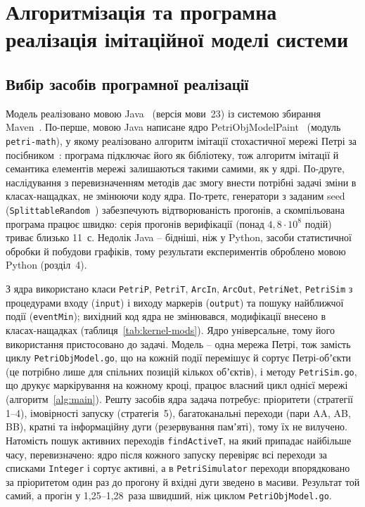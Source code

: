 \section{Алгоритмізація та програмна реалізація імітаційної моделі системи}

\subsection{Вибір засобів програмної реалізації}

Модель реалізовано мовою Java~\cite{java-jls} (версія мови~23) із системою збирання
Maven~\cite{maven}. По-перше, мовою Java написане ядро PetriObjModelPaint~\cite{petriobjmodelpaint}
(модуль \texttt{petri-math}), у якому реалізовано алгоритм імітації стохастичної мережі Петрі за
посібником~\cite{stetsenko-kursova,stetsenko-modeling}: програма підключає його як бібліотеку, тож
алгоритм імітації й семантика елементів мережі залишаються такими самими, як у ядрі. По-друге,
наслідування з перевизначенням методів дає змогу внести потрібні задачі зміни в класах-нащадках,
не змінюючи коду ядра. По-третє,
генератори з заданим seed (\texttt{SplittableRandom}~\cite{java-api}) забезпечують відтворюваність
прогонів, а скомпільована програма працює швидко: серія прогонів верифікації (понад
$4{,}8\cdot10^8$ подій) триває близько 11~с. Недолік Java -- бідніші, ніж у Python, засоби
статистичної обробки й побудови графіків, тому результати експериментів оброблено мовою Python
(розділ~4).

З ядра використано класи \texttt{PetriP}, \texttt{PetriT}, \texttt{ArcIn}, \texttt{ArcOut},
\texttt{PetriNet}, \texttt{PetriSim} з процедурами входу (\texttt{input}) і виходу маркерів
(\texttt{output}) та пошуку найближчої події (\texttt{eventMin}); вихідний код ядра не змінювався,
модифікації внесено в класах-нащадках (таблиця~\ref{tab:kernel-mods}). Ядро універсальне, тому
його використання пристосовано до задачі. Модель -- одна мережа Петрі,
тож замість циклу \texttt{PetriObjModel.go}, що на кожній події перемішує й сортує Петрі-обʼєкти
(це потрібно лише для спільних позицій кількох обʼєктів), і методу \texttt{PetriSim.go}, що друкує
маркірування на кожному кроці, працює власний цикл однієї мережі (алгоритм~\ref{alg:main}).
Решту засобів ядра задача потребує: пріоритети (стратегії 1--4), імовірності запуску (стратегія~5),
багатоканальні переходи (пари AA, AB, BB), кратні та інформаційну дуги (резервування памʼяті), тому
їх не вилучено. Натомість пошук активних переходів
\texttt{findActiveT}, на який припадає найбільше часу, перевизначено: ядро після кожного запуску
перевіряє всі переходи за списками \texttt{Integer} і сортує активні, а в \texttt{PetriSimulator}
переходи впорядковано за пріоритетом один раз до прогону й вхідні дуги зведено в масиви. Результат
той самий, а прогін у 1,25--1,28~раза швидший, ніж циклом
\texttt{PetriObjModel.go}.

